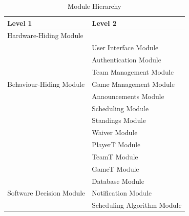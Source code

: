 \documentclass[12pt, titlepage]{article}
\begin{document}
\begin{table}[h!]
  \centering
  \begin{tabular}{p{} p{}}
    \toprule
    \textbf{Level 1}                                      & \textbf{Level 2}              \\
    \midrule

    {Hardware-Hiding Module}                              & ~                             \\
    \midrule

    \multirow{7}{0.3\textwidth}{Behaviour-Hiding Module}  & User Interface Module         \\
                                                          & Authentication Module         \\
                                                          & Team Management Module        \\
                                                          & Game Management Module        \\
                                                          & Announcements Module          \\
                                                          & Scheduling Module             \\
                                                          & Standings Module              \\
                                                          & Waiver Module                 \\
                                                          & PlayerT Module                \\
                                                          & TeamT Module                  \\
                                                          & GameT Module                  \\
    \midrule

    \multirow{3}{0.3\textwidth}{Software Decision Module} & {Database Module}             \\
                                                          & {Notification Module}         \\
                                                          & {Scheduling Algorithm Module} \\
    \bottomrule
  \end{tabular}
  \caption{Module Hierarchy}
  \label{TblMH}
\end{table}
\end{document}
